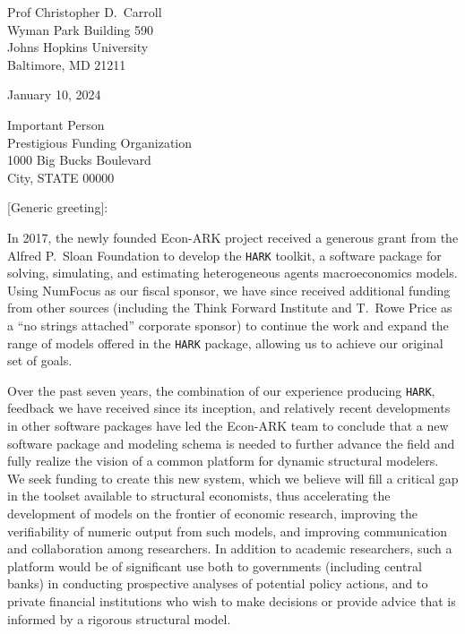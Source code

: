 \documentclass[11pt,pdftex,letterpaper]{article}
\begin{document}
	
\begin{singlespace}
	Prof Christopher D.\ Carroll\\
	Wyman Park Building 590\\
	Johns Hopkins University\\
	Baltimore, MD 21211
	
	January 10, 2024
	
	Important Person \\
	Prestigious Funding Organization \\
	1000 Big Bucks Boulevard \\
	City, STATE 00000
\end{singlespace}

\vspace{0.3cm}

[Generic greeting]:

In 2017, the newly founded Econ-ARK project received a generous grant from the Alfred P.\ Sloan Foundation to develop the \texttt{HARK} toolkit, a software package for solving, simulating, and estimating heterogeneous agents macroeconomics models. Using NumFocus as our fiscal sponsor, we have since received additional funding from other sources (including the Think Forward Institute and T.\ Rowe Price as a ``no strings attached'' corporate sponsor) to continue the work and expand the range of models offered in the \texttt{HARK} package, allowing us to achieve our original set of goals.

Over the past seven years, the combination of our experience producing \texttt{HARK}, feedback we have received since its inception, and relatively recent developments in other software packages have led the Econ-ARK team to conclude that a new software package and modeling schema is needed to further advance the field and fully realize the vision of a common platform for dynamic structural modelers. We seek funding to create this new system, which we believe will fill a critical gap in the toolset available to structural economists, thus accelerating the development of models on the frontier of economic research, improving the verifiability of numeric output from such models, and improving communication and collaboration among researchers. In addition to academic researchers, such a platform would be of significant use both to governments (including central banks) in conducting prospective analyses of potential policy actions, and to private financial institutions who wish to make decisions or provide advice that is informed by a rigorous structural model.
\end{document}
